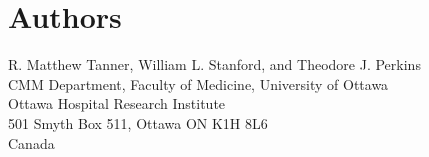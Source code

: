 \documentclass[12pt]{article}
\begin{document}
\section{Authors}
R. Matthew Tanner, William L. Stanford, and Theodore J. Perkins\\
CMM Department, Faculty of Medicine, University of Ottawa\\
Ottawa Hospital Research Institute \\
501 Smyth Box 511, Ottawa ON K1H 8L6\\
Canada\\
\end{document}
